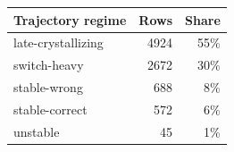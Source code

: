 \begin{tabular}{@{}lrr@{}}
\toprule
\textbf{Trajectory regime} & \textbf{Rows} & \textbf{Share} \\
\midrule
late-crystallizing & 4924 & 55\% \\
switch-heavy & 2672 & 30\% \\
stable-wrong & 688 & 8\% \\
stable-correct & 572 & 6\% \\
unstable & 45 & 1\% \\
\bottomrule
\end{tabular}
